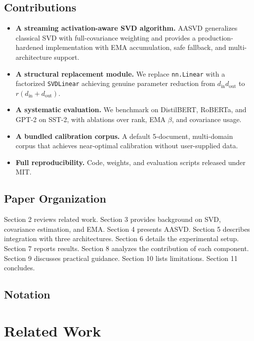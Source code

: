 \subsection{Contributions}

\begin{itemize}
\item \textbf{A streaming activation-aware SVD algorithm.} AASVD generalizes classical
  SVD with full-covariance weighting and provides a production-hardened
  implementation with EMA accumulation, safe fallback, and multi-architecture
  support.
\item \textbf{A structural replacement module.} We replace \texttt{nn.Linear} with a
  factorized \texttt{SVDLinear} achieving genuine parameter reduction from
  $d_\text{in} d_\text{out}$ to $r(d_\text{in} + d_\text{out})$.
\item \textbf{A systematic evaluation.} We benchmark on DistilBERT, RoBERTa, and GPT-2
  on SST-2, with ablations over rank, EMA $\beta$, and covariance usage.
\item \textbf{A bundled calibration corpus.} A default 5-document, multi-domain corpus
  that achieves near-optimal calibration without user-supplied data.
\item \textbf{Full reproducibility.} Code, weights, and evaluation scripts released
  under MIT.

\end{itemize}
\subsection{Paper Organization}

Section 2 reviews related work. Section 3 provides background on SVD, 
covariance estimation, and EMA. Section 4 presents AASVD. Section 5 
describes integration with three architectures. Section 6 details the 
experimental setup. Section 7 reports results. Section 8 analyzes the 
contribution of each component. Section 9 discusses practical guidance. 
Section 10 lists limitations. Section 11 concludes.



\subsection{Notation}



\section{Related Work}

